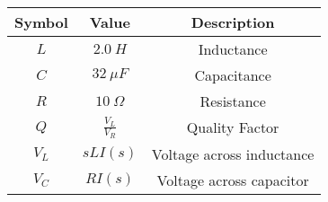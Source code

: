 

\begin{tabular}{|c|c|c|}
    \hline
     \textbf{Symbol} & \textbf{Value} &
     \textbf{Description}\\
    \hline
     $L$ &  $2.0\ H$ & Inductance\\[6pt]
    \hline 
     $C$ &  $32\ \mu F$ & Capacitance \\[6pt]
    \hline
     $R$ &  $10\ \Omega$ & Resistance\\[6pt]
    \hline
     $Q$ & $\frac{V_L}{V_R}$ & Quality Factor\\[6pt]
    \hline
    $V_L$ & $sLI(s)$ & Voltage across inductance\\[6pt]
    \hline
    $V_C$ & $RI(s)$ & Voltage across capacitor\\[6pt]
    \hline
\end{tabular}

